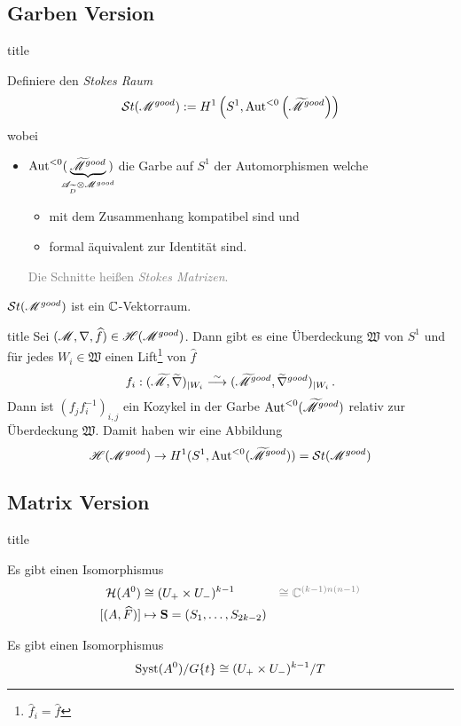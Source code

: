 \subsection{Garben Version}
\begin{frame}[t]{title}
  \begin{defn}
    Definiere den \emph{Stokes Raum}
    \[
      \mathcal{S}{}t(\mathscr{M}^{good})
        :=H^1\left(S^1,\operatorname{Aut}^{<0}\left(\widetilde {\mathscr{M}}^{good}\right)\right)
    \]
    wobei
    \begin{itemize}
      \item $\operatorname{Aut}^{<0}(\!\!\!\underset{\mathscr{A}_{\widetilde D}\otimes\mathscr{M}^{good}}
        {\underbrace{\widetilde{\mathscr{M}}^{good}}}\!\!\!)$
        die Garbe auf $S^1$ der Automorphismen welche
        \begin{itemize}
          \item mit dem Zusammenhang kompatibel sind und
          \item formal äquivalent zur Identität sind.
        \end{itemize}
        \textcolor{gray}{Die Schnitte heißen \emph{Stokes Matrizen}.}
    \end{itemize}
    \begin{thm}
      $\mathcal{S}{}t(\mathscr{M}^{good})$ ist ein $\mathbb{C}$-Vektorraum.
    \end{thm}
  \end{defn}
\end{frame}
\begin{frame}[t]{title}
  Sei $(\mathscr{M},\nabla,\widehat f)\in\mathscr{H}(\mathscr{M}^{good})$. Dann gibt es eine Überdeckung
  $\mathfrak{W}$ von $S^1$ und für jedes $W_i\in\mathfrak{W}$ einen
  Lift\footnote{$\hat f_i=\hat f$} von $\hat f$
  \[
    f_i:(\widetilde{\mathscr{M}},\widetilde\nabla)_{|W_i}
    \overset{\sim}{\longrightarrow}
    (\widetilde{\mathscr{M}}^{good},\widetilde\nabla^{good})_{|W_i} \,.
  \]
  Dann ist $(f_jf_i^{-1})_{i,j}$ ein Kozykel in der Garbe
  $\operatorname{Aut}^{<0}(\widetilde{\mathscr{M}}^{good})$ relativ zur Überdeckung $\mathfrak{W}$.
  Damit haben wir eine Abbildung
  \[
    \mathscr{H}(\mathscr{M}^{good})\to H^1(S^1,\operatorname{Aut}^{<0}(\widetilde{\mathscr{M}}^{good}))=\mathcal{S}{}t(\mathscr{M}^{good})
  \]
\end{frame}

\subsection{Matrix Version}
\begin{frame}[t]{title}
  \begin{tthm}
    Es gibt einen Isomorphismus
    \begin{align*}
      \cH(A^0)&\cong(U_+\times U_-)^{k-1}
      &\textcolor{gray}{\cong\C^{(k-1)n(n-1)}}
    \\ [(A,\hat F)]&\mapsto\textbf{S}=(S_1,\dots,S_{2k-2})
    \end{align*}
    \begin{cor}
      Es gibt einen Isomorphismus
      \[
        \operatorname{Syst}(A^0)/G\{t\}\cong(U_+\times U_-)^{k-1}/T
      \]
    \end{cor}
  \end{tthm}
\end{frame}

